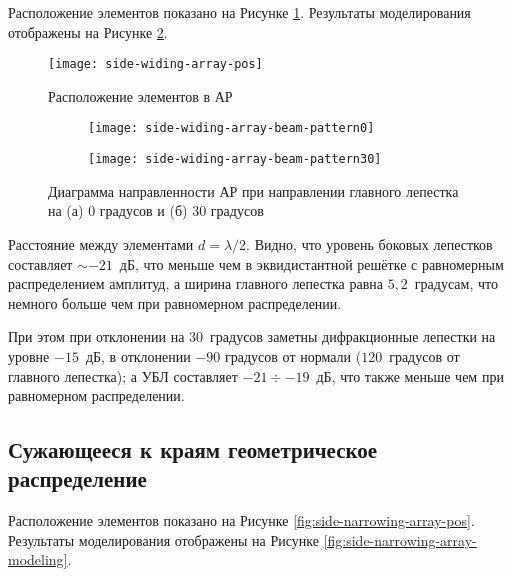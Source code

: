 Расположение элементов показано на Рисунке \ref{fig:side-widing-array-pos}. Результаты моделирования отображены на Рисунке \ref{fig:side-widing-array-modeling}.

\begin{figure}[!ht]
    \centering
    \texttt{[image: side-widing-array-pos]}
    \caption{Расположение элементов в АР}
    \label{fig:side-widing-array-pos}
\end{figure}


\begin{figure}[!ht]
    \centering
    \begin{subfigure}[b]{0.49\textwidth}
        \centering
        \hspace*{-3ex}
        \texttt{[image: side-widing-array-beam-pattern0]}
        \caption{}%
    \end{subfigure}
    \hfill
    \begin{subfigure}[b]{0.49\textwidth}
        \centering
        \hspace*{-3ex}
        \texttt{[image: side-widing-array-beam-pattern30]}
        \caption{}%
    \end{subfigure}
    \caption{%
    Диаграмма направленности АР при направлении главного лепестка на (а) 0 градусов и (б) 30 градусов
    }%
    \label{fig:side-widing-array-modeling}
\end{figure}

Расстояние между элементами $d=\lambda/2$. Видно, что уровень боковых лепестков составляет $\sim-21$~дБ, 
что меньше чем в эквидистантной решётке с равномерным распределением амплитуд, 
а ширина главного лепестка равна $5,2$~градусам, 
что немного больше чем при равномерном распределении.

При этом при отклонении на $30$~градусов заметны дифракционные лепестки на уровне $-15$~дБ, в отклонении $-90$ градусов от нормали ($120$~градусов от главного лепестка); а УБЛ составляет $-21 \div -19$~дБ, что также меньше чем при равномерном распределении.

\subsection{Сужающееся к краям геометрическое распределение}

Расположение элементов показано на Рисунке \ref{fig:side-narrowing-array-pos}. Результаты моделирования отображены на Рисунке \ref{fig:side-narrowing-array-modeling}.

